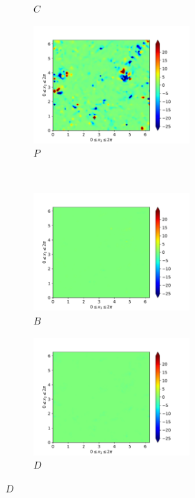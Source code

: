 \begin{figure}[H]
\begin{subfigure}{0.45\textwidth}
        \caption{$C$}
    \end{subfigure}
    \newline
    \begin{subfigure}{0.45\textwidth}
        \includegraphics[height=1.75in]{media/run-cds-65/P-ke-1440}
        \caption{$P$}
    \end{subfigure}
    ~
    \begin{subfigure}{0.45\textwidth}
        \includegraphics[height=1.75in]{media/run-cds-65/B-ke-1440}
        \caption{$B$}
    \end{subfigure}
    \newline
    \begin{subfigure}{0.45\textwidth}
        \includegraphics[height=1.75in]{media/run-cds-65/D-ke-1440}
        \caption{$D$}
    \end{subfigure}
\end{figure}
